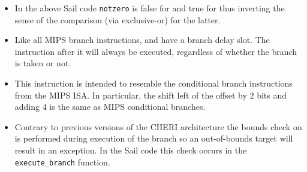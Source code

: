 \begin{itemize}
\item
In the above Sail code {\tt notzero} is false for  and true
for  thus inverting the sense of the
comparison (via exclusive-or) for the latter.
\item
Like all MIPS branch instructions,  and
 have a branch delay slot.  The instruction after
it will always be executed, regardless of whether the branch is taken
or not.
\item
This instruction is intended to resemble the conditional branch instructions
from the MIPS ISA. In particular, the shift left of the offset by 2 bits and
adding 4 is the same as MIPS conditional branches.
\item
Contrary to previous versions of the CHERI architecture the bounds check on
\PCC{} is performed during execution of the branch so an out-of-bounds target
will result in an exception. In the Sail code this check occurs in the
\lstinline{execute_branch} function.
\end{itemize}
